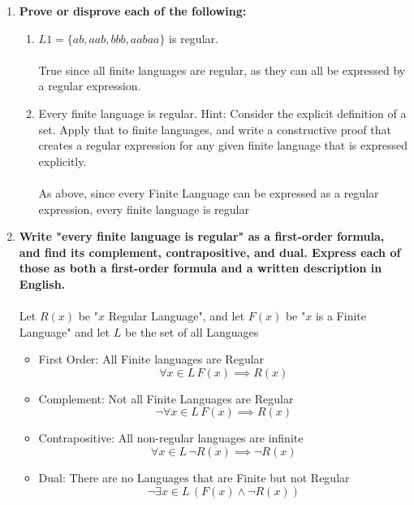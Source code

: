 \begin{enumerate}

\newpage
\item \textbf{Prove or disprove each of the following:}

\begin{enumerate}
    \item $L1 = \{ab, aab, bbb, aabaa\}$ is regular.
    \\\\ True since all finite languages are regular,  as they can all be expressed by a regular expression.
    \\
    \item Every finite language is regular. Hint: Consider the explicit definition of a set. Apply that to finite languages, and write a constructive proof that creates a regular expression for any given finite language that is expressed explicitly.
    \\\\
    As above, since every Finite Language can be expressed as a regular expression, every finite language is regular

\end{enumerate}

\newpage
\item \textbf{Write "every finite language is regular" as a first-order formula, and find its complement, contrapositive, and dual. Express each of those as both a first-order formula and a written description in English.}
\\\\Let $R(x)$ be "$x$ Regular Language", and let $F(x)$ be "$x$ is a Finite Language" and let $L$ be the set of all Languages
\begin{itemize}
	\item First Order: All Finite languages are Regular
		$$\forall x \in L \, F(x) \implies R(x)$$
	\item Complement: Not all Finite Languages are Regular
		$$\neg \forall x \in L \, F(x) \implies R(x)$$
	\item Contrapositive: All non-regular languages are infinite
	    $$ \forall x \in L \, \neg  R(x) \implies \neg  R(x)$$
	\item Dual: There are no Languages that are Finite but not Regular
		$$\neg \exists x \in L  \, ( F(x) \wedge \neg R(x) )$$
		

\end{itemize}
\end{enumerate}
